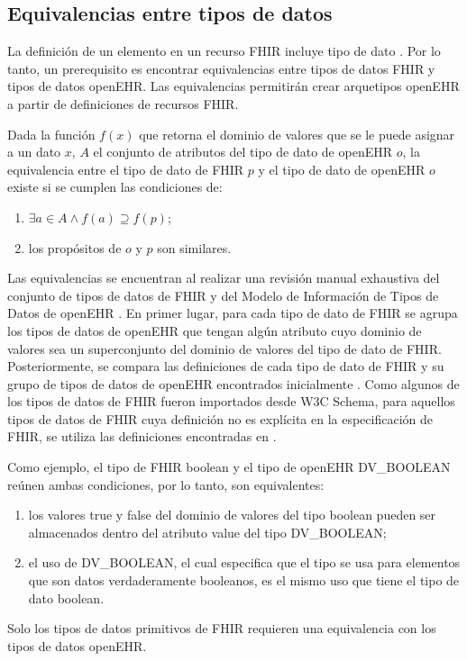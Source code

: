 \subsection{Equivalencias entre tipos de datos}

La definición de un elemento en un recurso FHIR incluye tipo de dato \cite{FHIRElement}. Por lo tanto, un prerequisito es encontrar equivalencias entre tipos de datos FHIR y tipos de datos openEHR. Las equivalencias permitirán crear arquetipos openEHR a partir de definiciones de recursos FHIR.

Dada la función \( f(x) \) que retorna el dominio de valores que se le puede asignar a un dato \( x \), \( A \) el conjunto de atributos del tipo de dato de openEHR \( o \), la equivalencia entre el tipo de dato de FHIR \( p \)  y el tipo de dato de openEHR \( o \) existe si se cumplen las condiciones de:

\begin{enumerate}
  \item \( \exists a \in A \land f(a) \supseteq f(p) \);
  \item los propósitos de \( o \) y \( p \) son similares.
\end{enumerate}

Las equivalencias se encuentran al realizar una revisión manual exhaustiva del conjunto de tipos de datos de FHIR \cite{FHIRDataTypes} y del Modelo de Información de Tipos de Datos de openEHR \cite{openEHRDataTypes}. En primer lugar, para cada tipo de dato de FHIR se agrupa los tipos de datos de openEHR que tengan algún atributo cuyo dominio de valores sea un superconjunto del dominio de valores del tipo de dato de FHIR. Posteriormente, se compara las definiciones de cada tipo de dato de FHIR y  su grupo de tipos de datos de openEHR encontrados inicialmente . Como algunos de los tipos de datos de FHIR fueron importados desde W3C Schema, para aquellos tipos de datos de FHIR cuya definición no es explícita en la especificación de FHIR, se utiliza las definiciones encontradas en \cite{W3C}.

Como ejemplo, el tipo de FHIR boolean y el tipo de openEHR DV\_BOOLEAN reúnen ambas condiciones, por lo tanto, son equivalentes:
\begin{enumerate}
  \item los valores true y false del dominio de valores del tipo boolean pueden ser almacenados dentro del atributo value del tipo DV\_BOOLEAN;
  \item el uso de DV\_BOOLEAN, el cual especifica que el tipo se usa para elementos que son datos verdaderamente booleanos, es el mismo uso que tiene el tipo de dato boolean.
\end{enumerate}

Solo los tipos de datos primitivos de FHIR requieren una equivalencia con los tipos de datos openEHR.
